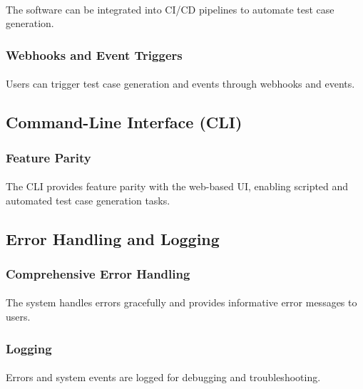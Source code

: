 \documentclass{article}
\begin{document}
\paragraph{}
The software can be integrated into CI/CD pipelines to automate test case generation.

\subsubsection{Webhooks and Event Triggers}
\paragraph{}
Users can trigger test case generation and events through webhooks and events.

\subsection{Command-Line Interface (CLI)}
\subsubsection{Feature Parity}
\paragraph{}
The CLI provides feature parity with the web-based UI, enabling scripted and
automated test case generation tasks.

\subsection{Error Handling and Logging}
\subsubsection{Comprehensive Error Handling}
\paragraph{}
The system handles errors gracefully and provides informative error messages to users.

\subsubsection{Logging}
\paragraph{}
Errors and system events are logged for debugging and troubleshooting.
\end{document}
